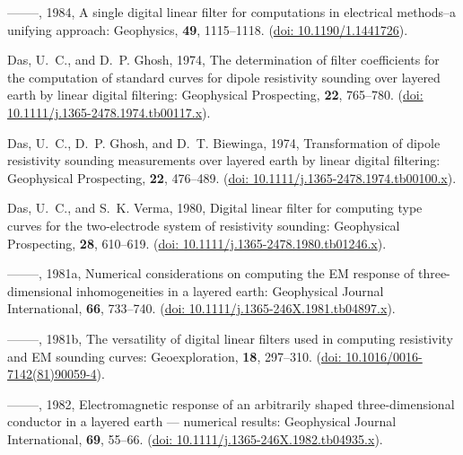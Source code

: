\documentclass[a4paper, twoside, parskip, 10pt]{scrartcl}
\begin{document}
\begin{multicols}{2}
\begin{thebibliography}{}
--------, 1984, A single digital linear filter for computations in electrical
  methods--a unifying approach: Geophysics, {\bf 49}, 1115--1118.
\newblock (\href{https://doi.org/10.1190/1.1441726}{doi: 10.1190/1.1441726}).

Das, U.~C., and D.~P. Ghosh,  1974, The determination of filter coefficients
  for the computation of standard curves for dipole resistivity sounding over
  layered earth by linear digital filtering: Geophysical Prospecting, {\bf 22},
  765--780.
\newblock (\href{https://doi.org/10.1111/j.1365-2478.1974.tb00117.x}{doi:
  10.1111/j.1365-2478.1974.tb00117.x}).

Das, U.~C., D.~P. Ghosh, and D.~T. Biewinga,  1974, Transformation of dipole
  resistivity sounding measurements over layered earth by linear digital
  filtering: Geophysical Prospecting, {\bf 22}, 476--489.
\newblock (\href{https://doi.org/10.1111/j.1365-2478.1974.tb00100.x}{doi:
  10.1111/j.1365-2478.1974.tb00100.x}).

Das, U.~C., and S.~K. Verma,  1980, Digital linear filter for computing type
  curves for the two-electrode system of resistivity sounding: Geophysical
  Prospecting, {\bf 28}, 610--619.
\newblock (\href{https://doi.org/10.1111/j.1365-2478.1980.tb01246.x}{doi:
  10.1111/j.1365-2478.1980.tb01246.x}).

--------, 1981a, Numerical considerations on computing the {EM} response of
  three-dimensional inhomogeneities in a layered earth: Geophysical Journal
  International, {\bf 66}, 733--740.
\newblock (\href{https://doi.org/10.1111/j.1365-246X.1981.tb04897.x}{doi:
  10.1111/j.1365-246X.1981.tb04897.x}).

--------, 1981b, The versatility of digital linear filters used in computing
resistivity and EM sounding curves: Geoexploration, {\bf 18}, 297--310.
\newblock (\href{https://doi.org/10.1016/0016-7142(81)90059-4}{doi:
10.1016/0016-7142(81)90059-4}).

--------, 1982, Electromagnetic response of an arbitrarily shaped
  three-dimensional conductor in a layered earth — numerical results:
  Geophysical Journal International, {\bf 69}, 55--66.
\newblock (\href{https://doi.org/10.1111/j.1365-246X.1982.tb04935.x}{doi:
  10.1111/j.1365-246X.1982.tb04935.x}).


\end{thebibliography}
\end{multicols}
\end{document}
